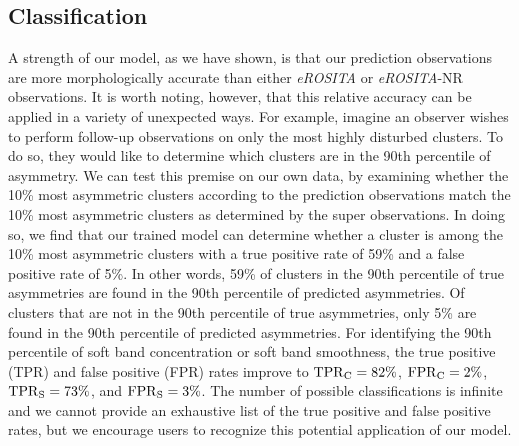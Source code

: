 \subsection{Classification}\label{classification}
A strength of our model, as we have shown, is that our prediction observations are more morphologically accurate than either \textit{eROSITA} or \textit{eROSITA}-NR observations. It is worth noting, however, that this relative accuracy can be applied in a variety of unexpected ways. For example, imagine an observer wishes to perform follow-up observations on only the most highly disturbed clusters. To do so, they would like to determine which clusters are in the 90th percentile of asymmetry. We can test this premise on our own data, by examining whether the 10\% most asymmetric clusters according to the prediction observations match the 10\% most asymmetric clusters as determined by the super observations. In doing so, we find that our trained model can determine whether a cluster is among the 10\% most asymmetric clusters with a true positive rate of 59\% and a false positive rate of 5\%. In other words, 59\% of clusters in the 90th percentile of true asymmetries are found in the 90th percentile of predicted asymmetries. Of clusters that are not in the 90th percentile of true asymmetries, only 5\% are found in the 90th percentile of predicted asymmetries. For identifying the 90th percentile of soft band concentration or soft band smoothness, the true positive (TPR) and false positive (FPR) rates improve to $\rm{TPR}_{C} = 82\%$, $\rm{FPR}_{C} = 2\%$, $\rm{TPR}_{S} = 73\%$, and $\rm{FPR}_{S} = 3\%$. The number of possible classifications is infinite and we cannot provide an exhaustive list of the true positive and false positive rates, but we encourage users to recognize this potential application of our model.

